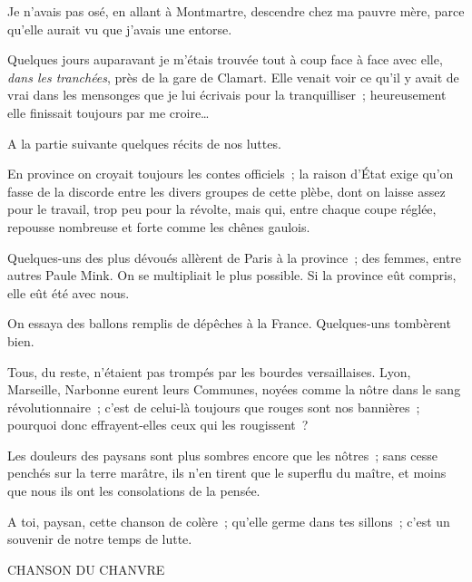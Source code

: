 \documentclass[french,twoside]{book} %
\newenvironment{quoteblock}%
  {\begin{quoting}}
  {\end{quoting}}
\newenvironment{quotebar}{%
    \def\FrameCommand{{\color{rubric!10!}\vrule width 0.5em} \hspace{0.9em}}%
    \def\OuterFrameSep{\itemsep} %
    \MakeFramed {\advance\hsize-\width \FrameRestore}
  }%
  {%
    \endMakeFramed
  }
\renewenvironment{quoteblock}%
  {%
    \savenotes
    \setstretch{0.9}
    \normalfont
    \begin{quotebar}
  }
  {%
    \end{quotebar}
    \spewnotes
  }
\begin{document}
Je n’avais pas osé, en allant à Montmartre, descendre chez ma pauvre mère, parce qu’elle aurait vu que j’avais une entorse.\par
Quelques jours auparavant je m’étais trouvée tout à coup face à face avec elle, \emph{dans les tranchées}, près de la gare de Clamart. Elle venait voir ce qu’il y avait de vrai dans les mensonges que je lui écrivais pour la tranquilliser ; heureusement elle finissait toujours par me croire…\par
A la partie suivante quelques récits de nos luttes.\par
En province on croyait toujours les contes officiels ; la raison d’État exige qu’on fasse de la discorde entre les divers groupes de cette plèbe, dont on laisse assez pour le travail, trop peu pour la révolte, mais qui, entre chaque coupe réglée, repousse nombreuse et forte comme les chênes gaulois.\par
Quelques-uns des plus dévoués allèrent de Paris à la province ; des femmes, entre autres  Paule Mink. On se multipliait le plus possible. Si la province eût compris, elle eût été avec nous.\par
On essaya des ballons remplis de dépêches à la France. Quelques-uns tombèrent bien.\par
Tous, du reste, n’étaient pas trompés par les bourdes versaillaises. Lyon, Marseille, Narbonne eurent leurs Communes, noyées comme la nôtre dans le sang révolutionnaire ; c’est de celui-là toujours que rouges sont nos bannières ; pourquoi donc effrayent-elles ceux qui les rougissent ?\par
Les douleurs des paysans sont plus sombres encore que les nôtres ; sans cesse penchés sur la terre marâtre, ils n’en tirent que le superflu du maître, et moins que nous ils ont les consolations de la pensée.\par
A toi, paysan, cette chanson de colère ; qu’elle germe dans tes sillons ; c’est un souvenir de notre temps de lutte.\par

\begin{quoteblock}
CHANSON DU CHANVRE\end{quoteblock}
\end{document}
